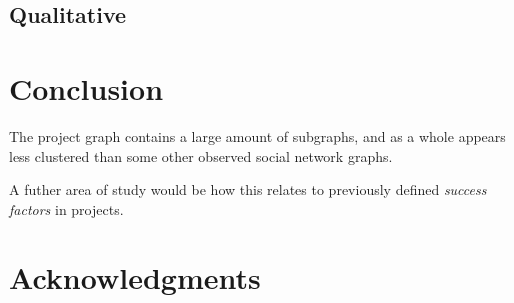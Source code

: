 \documentclass{proc}
\begin{document}
\subsection{Qualitative}

\section{Conclusion}
The project graph contains a large amount of subgraphs, and as a whole appears less clustered than some other observed social network graphs\cite{madey2002open}.

A futher area of study would be how this relates to previously defined \textit{success factors} in projects\cite{cooke2002real}.


\section{Acknowledgments}



\end{document}

